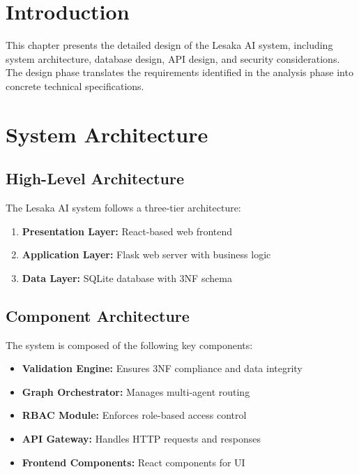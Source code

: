 
\section{Introduction}

This chapter presents the detailed design of the Lesaka AI system, including system architecture, database design, API design, and security considerations. The design phase translates the requirements identified in the analysis phase into concrete technical specifications.

\section{System Architecture}

\subsection{High-Level Architecture}

The Lesaka AI system follows a three-tier architecture:

\begin{enumerate}
    \item \textbf{Presentation Layer:} React-based web frontend
    \item \textbf{Application Layer:} Flask web server with business logic
    \item \textbf{Data Layer:} SQLite database with 3NF schema
\end{enumerate}

\subsection{Component Architecture}

The system is composed of the following key components:

\begin{itemize}
    \item \textbf{Validation Engine:} Ensures 3NF compliance and data integrity
    \item \textbf{Graph Orchestrator:} Manages multi-agent routing
    \item \textbf{RBAC Module:} Enforces role-based access control
    \item \textbf{API Gateway:} Handles HTTP requests and responses
    \item \textbf{Frontend Components:} React components for UI
\end{itemize}

